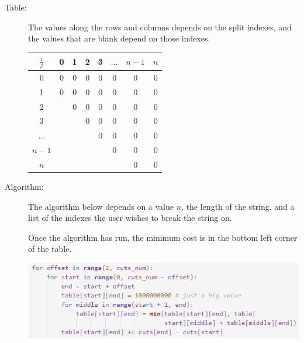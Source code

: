 \documentclass[12pt]{article}
\begin{document}
\begin{enumerate}
\begin{description}
        \item [Table:] The values along the rows and columns depends on the split
        indexes, and the values that are blank depend on those indexes.
        \begin{center}
            \begin{tabular}{|c|c|c|c|c|c|c|c|} \hline
                $\frac{i}{j}$  & 0 & 1 & 2 & 3 & $\ldots{}$ & $n-1$ & $n$\\ \hline
                0 & 0 & 0 & 0 & 0 & 0 & 0 & 0 \\ \hline
                1 & 0 & 0 & 0 & 0 & 0 & 0 & 0 \\ \hline
                2 & & 0 & 0 & 0 & 0 & 0 & 0 \\ \hline
                3 & & & 0 & 0 & 0 & 0 & 0 \\ \hline
                $\ldots{}$ & & & & 0 & 0 & 0 & 0 \\ \hline
                $n-1$ & & & & & 0 & 0 & 0 \\ \hline
                $n$ & & & & & & 0 & 0 \\ \hline
                \hline
            \end{tabular}
        \end{center}

        \pagebreak
        \item [Algorithm:] The algorithm below depends on a value $n$, the length of the
        string, and a list of the indexes the user wishes to break the string on.

        Once the algorithm has run, the minimum cost is in the bottom left corner of the
        table.
        \begin{center}
            \includegraphics[width=5.2in]{algorithm.jpg}
        \end{center}
    \end{description}
\end{enumerate}
\end{document}
